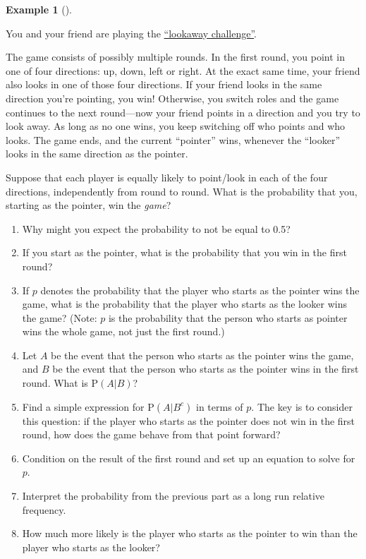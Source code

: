 \documentclass[
  letterpaper,
  DIV=11,
  numbers=noendperiod]{scrreprt}
\providecommand{\tightlist}{%
  \setlength{\itemsep}{0pt}\setlength{\parskip}{0pt}}
\theoremstyle{plain}
\theoremstyle{definition}
\newtheorem{example}{Example}[chapter]
\theoremstyle{definition}
\theoremstyle{definition}
\theoremstyle{remark}
\begin{document}
\begin{tcolorbox}[enhanced jigsaw, opacityback=0, left=2mm, colframe=quarto-callout-note-color-frame, toprule=.15mm, breakable, colback=white, leftrule=.75mm, arc=.35mm, rightrule=.15mm, bottomrule=.15mm]

\begin{example}[]\protect\hypertarget{exm-lookaway-ltp}{}\label{exm-lookaway-ltp}

You and your friend are playing the
\href{https://fivethirtyeight.com/features/what-are-your-chances-of-winning-the-u-s-open/}{``lookaway
challenge''}.

The game consists of possibly multiple rounds. In the first round, you
point in one of four directions: up, down, left or right. At the exact
same time, your friend also looks in one of those four directions. If
your friend looks in the same direction you're pointing, you win!
Otherwise, you switch roles and the game continues to the next
round---now your friend points in a direction and you try to look away.
As long as no one wins, you keep switching off who points and who looks.
The game ends, and the current ``pointer'' wins, whenever the ``looker''
looks in the same direction as the pointer.

Suppose that each player is equally likely to point/look in each of the
four directions, independently from round to round. What is the
probability that you, starting as the pointer, win the \emph{game}?

\begin{enumerate}
\def\labelenumi{\arabic{enumi}.}
\tightlist
\item
  Why might you expect the probability to not be equal to 0.5?
\item
  If you start as the pointer, what is the probability that you win in
  the first round?
\item
  If \(p\) denotes the probability that the player who starts as the
  pointer wins the game, what is the probability that the player who
  starts as the looker wins the game? (Note: \(p\) is the probability
  that the person who starts as pointer wins the whole game, not just
  the first round.)
\item
  Let \(A\) be the event that the person who starts as the pointer wins
  the game, and \(B\) be the event that the person who starts as the
  pointer wins in the first round. What is \(\textrm{P}(A|B)\)?
\item
  Find a simple expression for \(\textrm{P}(A | B^c)\) in terms of
  \(p\). The key is to consider this question: if the player who starts
  as the pointer does not win in the first round, how does the game
  behave from that point forward?
\item
  Condition on the result of the first round and set up an equation to
  solve for \(p\).
\item
  Interpret the probability from the previous part as a long run
  relative frequency.
\item
  How much more likely is the player who starts as the pointer to win
  than the player who starts as the looker?
\end{enumerate}


\end{example}
\end{tcolorbox}
\end{document}

